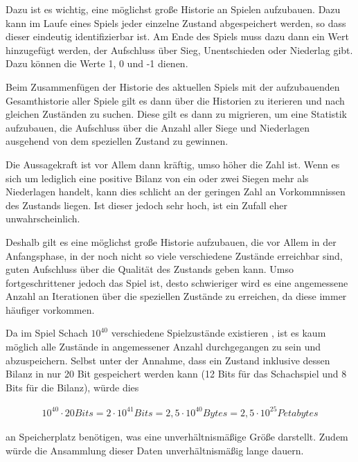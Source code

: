 Dazu ist es wichtig, eine möglichst große Historie an Spielen aufzubauen. Dazu kann im Laufe eines Spiels jeder einzelne Zustand abgespeichert werden, so dass dieser eindeutig identifizierbar ist. Am Ende des Spiels muss dazu dann ein Wert hinzugefügt werden, der Aufschluss über Sieg, Unentschieden oder Niederlag gibt. Dazu können die Werte 1, 0 und -1 dienen.

Beim Zusammenfügen der Historie des aktuellen Spiels mit der aufzubauenden Gesamthistorie aller Spiele gilt es dann über die Historien zu iterieren und nach gleichen Zuständen zu suchen. Diese gilt es dann zu migrieren, um eine Statistik aufzubauen, die Aufschluss über die Anzahl aller Siege und Niederlagen ausgehend von dem speziellen Zustand zu gewinnen.

Die Aussagekraft ist vor Allem dann kräftig, umso höher die Zahl ist. Wenn es sich um lediglich eine positive Bilanz von ein oder zwei Siegen mehr als Niederlagen handelt, kann dies schlicht an der geringen Zahl an Vorkommnissen des Zustands liegen. Ist dieser jedoch sehr hoch, ist ein Zufall eher unwahrscheinlich.

Deshalb gilt es eine möglichst große Historie aufzubauen, die vor Allem in der Anfangsphase, in der noch nicht so viele verschiedene Zustände erreichbar sind, guten Aufschluss über die Qualität des Zustands geben kann. Umso fortgeschrittener jedoch das Spiel ist, desto schwieriger wird es eine angemessene Anzahl an Iterationen über die speziellen Zustände zu erreichen, da diese immer häufiger vorkommen.

Da im Spiel Schach $10^{40}$ verschiedene Spielzustände existieren \cite{Stroetmann2018}, ist es kaum möglich alle Zustände in angemessener Anzahl durchgegangen zu sein und abzuspeichern. Selbst unter der Annahme, dass ein Zustand inklusive dessen Bilanz in nur 20 Bit gespeichert werden kann (12 Bits für das Schachspiel \cite{Speight} und 8 Bits für die Bilanz), würde dies 

\begin{equation}
\begin{aligned}
10^{40}  \cdot  20 Bits = 2  \cdot  10^{41} Bits = 2,5  \cdot  10^{40} Bytes = 2,5  \cdot  10^{25} Petabytes
\end{aligned}
\end{equation}

an Speicherplatz benötigen, was eine unverhältnismäßige Größe darstellt. Zudem würde die Ansammlung dieser Daten unverhältnismäßig lange dauern.


